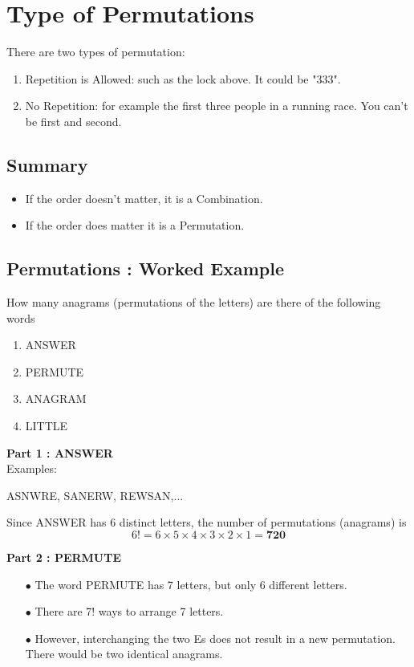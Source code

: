 \documentclass[12pt]{report}
\begin{document}
	\section*{Type of Permutations}
	There are two types of permutation:
	\begin{enumerate}
		\item Repetition is Allowed: such as the lock above. It could be "333".
		\item No Repetition: for example the first three people in a running race. You can't be first and second.
	\end{enumerate}
	
	\subsection*{Summary}
	\begin{itemize}
		\item If the order doesn't matter, it is a Combination.
		\item If the order does matter it is a Permutation.
	\end{itemize}
\newpage
	
	\subsection*{Permutations : Worked Example}
	
	How many anagrams (permutations of the letters) are there of the following words
	\begin{enumerate}
		\item ANSWER
		\item PERMUTE
		\item ANAGRAM
		\item LITTLE
	\end{enumerate}
	
	
	\textbf{Part 1 : ANSWER}\\
	Examples:
	\begin{center}
		ASNWRE,\;
		SANERW,\;
		REWSAN,\;...
	\end{center}
	
	Since ANSWER has 6 distinct letters, the number of permutations (anagrams) is
	\LARGE
	\[6! = 6\times 5 \times 4 \times 3 \times 2\times 1 = \boldsymbol{720} \]
	
	\textbf{Part 2 : PERMUTE}\\
	\begin{itemize}
		\item[$\bullet$] The word PERMUTE has 7 letters, but only 6 different letters. 
		\item[$\bullet$] There are 7! ways to arrange 7 letters.
		\item[$\bullet$] However, interchanging the two Es does not result in a new permutation. There would be two identical anagrams.
	\end{itemize}
	
\end{document}

